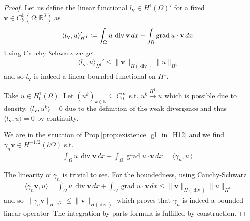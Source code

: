 \documentclass[12pt,a4paper]{article}
\numberwithin{equation}{subsection}
\numberwithin{lemma}{subsection}
\theoremstyle{definition}
\DeclareMathOperator{\diver}{div}
\DeclareMathOperator{\grad}{grad}
\newcommand{\naturalnum}{\mathbb{N}}
\newcommand{\real}{\mathbb{R}}
\begin{document}
\begin{proof}
    Let us define 
    the linear functional $l_\mathbf{v} \in H^1(\Omega)'$ for a fixed $\mathbf{v} \in C_b^1(\Omega;\real^3)$
    as
    \begin{align*}
        \langle l_\mathbf{v}, u \rangle _{H^1}' \vcentcolon= \int_\Omega u \, \diver \mathbf{v} \, dx 
         + \int_\Omega \grad u \cdot \mathbf{v} \, dx.
    \end{align*}
    Using Cauchy-Schwarz we get
    \begin{align*}
        \langle l_\mathbf{v}, u \rangle _{H^1}' 
        \leq \lVert \mathbf{v} \rVert _{H(\diver)} \lVert u \rVert _{H^1} 
    \end{align*}
    and so $l_\mathbf{v}$ is indeed a linear bounded functional on $H^1$.
    
    Take $u \in H^1_0(\Omega)$. 
    Let $(u^k)_{k\in \naturalnum} \subseteq C^\infty_0$ s.t. 
    $u^k \xrightarrow{H^1} u$ which is possible due to density. 
    $\langle l_\mathbf{v}, u^k \rangle  = 0$  due to the 
    definition of the weak divergence and thus $\langle l_\mathbf{v}, u \rangle = 0$
    by continuity.

    We are in the situation of Prop.\ref{prop:existence_gl_in_H12} 
    and we find $\gamma_n \mathbf{v} \in H^{-1/2}(\partial \Omega)$ 
    s.t. 
    \begin{align*}
        \int_\Omega u \, \diver \mathbf{v} \, dx 
        + \int_\Omega \grad u \cdot \mathbf{v} \, dx 
        = \langle \gamma_n , u \, \rangle.
    \end{align*}
    
    The linearity of $\gamma_n$ is trivial to see.
    For the boundedness, using Cauchy-Schwarz 
    \begin{align*}
        \langle \gamma_n \mathbf{v}, u \rangle 
        = \int_\Omega u \, \diver \mathbf{v} \, dx 
            + \int_\Omega \grad u \cdot \mathbf{v} \, dx
        \leq \lVert \mathbf{v} \rVert _{H(\diver)} \lVert u \rVert _{H^1}
    \end{align*}
    and so $\lVert \gamma_n \mathbf{v} \rVert _{H^{-1/2}} \leq \lVert \mathbf{v} \rVert _{H(\diver)}$
    which proves that $\gamma_n$ is indeed a bounded linear operator. The integration
    by parts formula is fulfilled by construction. 


\end{proof}
\end{document}
